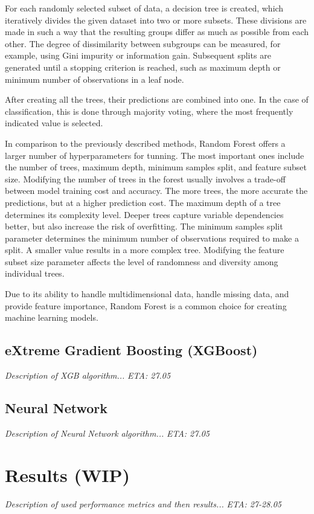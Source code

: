 For each randomly selected subset of data, a decision tree is created, which iteratively divides the given dataset into two or more subsets. These divisions are made in such a way that the resulting groups differ as much as possible from each other. The degree of dissimilarity between subgroups can be measured, for example, using Gini impurity or information gain. Subsequent splits are generated until a stopping criterion is reached, such as maximum depth or minimum number of observations in a leaf node.

After creating all the trees, their predictions are combined into one. In the case of classification, this is done through majority voting, where the most frequently indicated value is selected.

In comparison to the previously described methods, Random Forest offers a larger number of hyperparameters for tunning. The most important ones include the number of trees, maximum depth, minimum samples split, and feature subset size. Modifying the number of trees in the forest usually involves a trade-off between model training cost and accuracy. The more trees, the more accurate the predictions, but at a higher prediction cost. The maximum depth of a tree determines its complexity level. Deeper trees capture variable dependencies better, but also increase the risk of overfitting. The minimum samples split parameter determines the minimum number of observations required to make a split. A smaller value results in a more complex tree. Modifying the feature subset size parameter affects the level of randomness and diversity among individual trees.

Due to its ability to handle multidimensional data, handle missing data, and provide feature importance, Random Forest is a common choice for creating machine learning models.

\subsection{eXtreme Gradient Boosting (XGBoost)}
\textit{Description of XGB algorithm...} \textit{ETA: 27.05}

\subsection{Neural Network}
\textit{Description of Neural Network algorithm...} \textit{ETA: 27.05}


\section{Results (WIP)}
\textit{Description of used performance metrics and then results...} 
\textit{ETA: 27-28.05}

